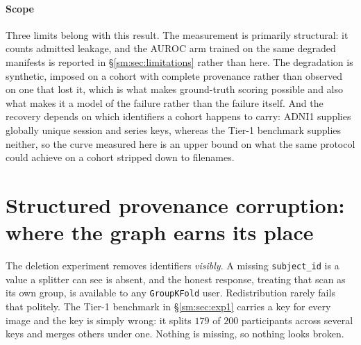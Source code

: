 \documentclass[11pt]{article}
\begin{document}
\paragraph{Scope}
Three limits belong with this result. The measurement is primarily structural: it counts admitted leakage,
and the AUROC arm trained on the same degraded manifests is reported
in \S\ref{sm:sec:limitations} rather than here. The degradation is synthetic, imposed on a
cohort with complete provenance rather than observed on one that lost it,
which is what makes ground-truth scoring possible and also what makes it
a model of the failure rather than the failure itself. And the recovery
depends on which identifiers a cohort happens to carry: ADNI1 supplies
globally unique session and series keys, whereas the Tier-1 benchmark
supplies neither, so the curve measured here is an upper bound on what
the same protocol could achieve on a cohort stripped down to filenames.



\section{Structured provenance corruption: where the graph earns its place}
\label{sm:sec:provenance_stress}

The deletion experiment removes identifiers \emph{visibly}. A missing
\texttt{subject\_id} is a value a splitter can see is absent, and the honest
response, treating that scan as its own group, is available to any
\texttt{GroupKFold} user. Redistribution rarely fails that politely. The
Tier-1 benchmark in \S\ref{sm:sec:exp1} carries a key for every image and the
key is simply wrong: it splits $179$ of $200$ participants across several
keys and merges others under one. Nothing is missing, so nothing looks
broken.
\end{document}
